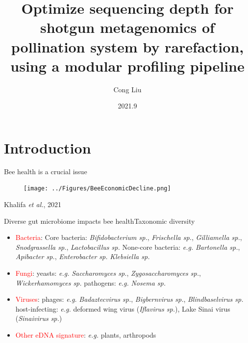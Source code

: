 \documentclass{beamer}
\title{Optimize sequencing depth for shotgun metagenomics of pollination system by rarefaction, using a modular profiling pipeline}
\author{Cong Liu}
\date{2021.9}
\begin{document}
\begin{frame}
    \titlepage    
\end{frame}

\section{Introduction}

\begin{frame}{Bee health is a crucial issue}
    \begin{figure}
        \texttt{[image: ../Figures/BeeEconomicDecline.png]}
    \end{figure}
    \centering
    Khalifa \textit{et al.}, 2021
\end{frame}

\begin{frame}{Diverse gut microbiome impacts bee health}{Taxonomic diversity}
    \begin{itemize}
        \item \textcolor{red}{Bacteria}:
        \newline Core bacteria: \textit{Bifidobacterium sp.}, \textit{Frischella sp.}, \textit{Gilliamella sp.}, \textit{Snodgrassella sp.}, \textit{Lactobacillus sp.}
        \newline None-core bacteria: \textit{e.g.} \textit{Bartonella sp.}, \textit{Apibacter sp.}, \textit{Enterobacter sp.} \textit{Klebsiella sp.}
        \item \textcolor{red}{Fungi}: 
        \newline yeasts: \textit{e.g.} \textit{Saccharomyces sp.}, \textit{Zygosaccharomyces sp.}, \textit{Wickerhamomyces sp.}
        \newline pathogens: \textit{e.g.} \textit{Nosema sp.}
        \item \textcolor{red}{Viruses}: 
        \newline phages: \textit{e.g.} \textit{Badaztecvirus sp.}, \textit{Bigbernvirus sp.}, \textit{Blindbaselvirus sp.}
        \newline host-infecting: \textit{e.g.} deformed wing virus (\textit{Iflavirus sp.}), Lake Sinai virus (\textit{Sinaivirus sp.})
        \item \textcolor{red}{Other eDNA signature}: 
        \newline \textit{e.g.} plants, arthropods
    \end{itemize}
\end{frame}
\end{document}
